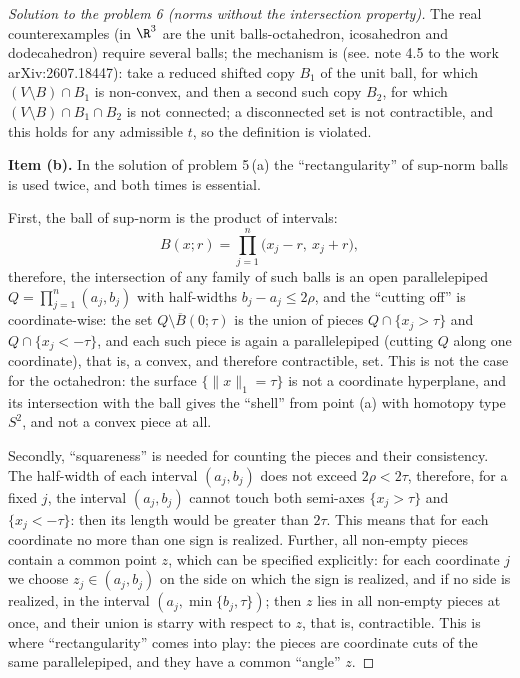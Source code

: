 \documentclass[a4paper,12pt]{report}
\begin{document}
\begin{proof}[Solution to the problem \textup{6} \textup{(}norms without the intersection property\textup{)}]
The real counterexamples \textup{(}in $\R^3$ are the unit balls-octahedron, icosahedron and dodecahedron\textup{)} require several balls; the mechanism is \textup{(}see\textup{.} note \textup{4.5} to the work arXiv:2607.18447\textup{)}: take a reduced shifted copy $B_1$ of the unit ball, for which $(V \setminus B) \cap B_1$ is non-convex, and then a second such copy $B_2$, for which $(V \setminus B) \cap B_1 \cap B_2$ is not connected; a disconnected set is not contractible, and this holds for any admissible $t$, so the definition is violated.

\textbf{Item \textup{(b)}.} In the solution of problem \textup{5}\,\textup{(a)} the ``rectangularity'' of sup-norm balls is used twice, and both times is essential.

First, the ball of sup-norm is the product of intervals:
\[
B(x; r) = \prod_{j=1}^n \bigl( x_j - r,\ x_j + r \bigr),
\]
therefore, the intersection of any family of such balls is an open parallelepiped $Q = \prod_{j=1}^n (a_j, b_j)$ with half-widths $b_j - a_j \le 2\rho$, and the ``cutting off'' is coordinate-wise: the set $Q \setminus \overline B(0; \tau)$ is the union of pieces $Q \cap \{ x_j > \tau \}$ and $Q \cap \{ x_j < -\tau \}$, and each such piece is again a parallelepiped \textup{(}cutting $Q$ along one coordinate\textup{)}, that is, a convex, and therefore contractible, set. This is not the case for the octahedron: the surface $\bigl\{ \|x\|_1 = \tau \bigr\}$ is not a coordinate hyperplane, and its intersection with the ball gives the ``shell'' from point \textup{(a)} with homotopy type $S^2$, and not a convex piece at all.

Secondly, ``squareness'' is needed for counting the pieces and their consistency. The half-width of each interval $(a_j, b_j)$ does not exceed $2\rho < 2\tau$, therefore, for a fixed $j$, the interval $(a_j, b_j)$ cannot touch both semi-axes $\{ x_j > \tau \}$ and $\{ x_j < -\tau \}$: then its length would be greater than $2\tau$. This means that for each coordinate no more than one sign is realized. Further, all non-empty pieces contain a common point $z$, which can be specified explicitly: for each coordinate $j$ we choose $z_j \in (a_j, b_j)$ on the side on which the sign is realized, and if no side is realized, in the interval $(a_j, \min\{ b_j, \tau \})$; then $z$ lies in all non-empty pieces at once, and their union is starry with respect to $z$, that is, contractible. This is where ``rectangularity'' comes into play: the pieces are coordinate cuts of the same parallelepiped, and they have a common ``angle'' $z$.


\end{proof}
\end{document}
